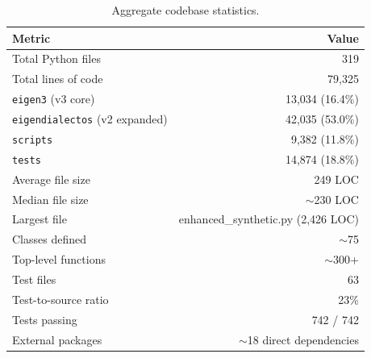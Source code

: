 \documentclass[11pt,a4paper]{article}
\begin{document}
\begin{table}[H]
\centering
\caption{Aggregate codebase statistics.}
\begin{tabular}{@{}lr@{}}
\toprule
\textbf{Metric} & \textbf{Value} \\
\midrule
Total Python files & 319 \\
Total lines of code & 79{,}325 \\
\quad \texttt{eigen3} (v3 core) & 13{,}034 (16.4\%) \\
\quad \texttt{eigendialectos} (v2 expanded) & 42{,}035 (53.0\%) \\
\quad \texttt{scripts} & 9{,}382 (11.8\%) \\
\quad \texttt{tests} & 14{,}874 (18.8\%) \\
Average file size & 249 LOC \\
Median file size & $\sim$230 LOC \\
Largest file & enhanced\_synthetic.py (2{,}426 LOC) \\
Classes defined & $\sim$75 \\
Top-level functions & $\sim$300+ \\
Test files & 63 \\
Test-to-source ratio & 23\% \\
Tests passing & 742 / 742 \\
External packages & $\sim$18 direct dependencies \\
\bottomrule
\end{tabular}
\end{table}
\end{document}
